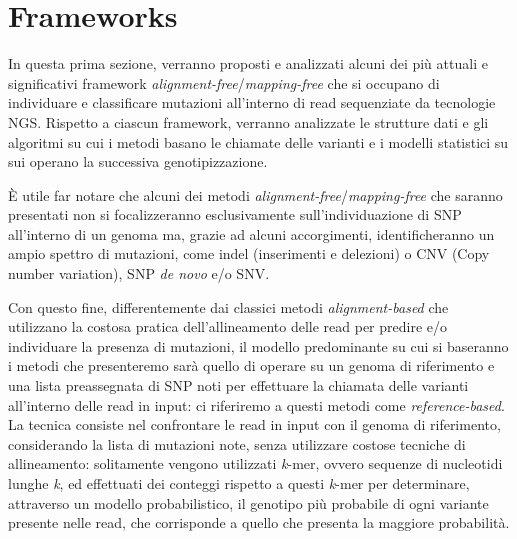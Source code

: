 \documentclass[../main.tex]{subfiles}
\begin{document}
\section{Frameworks}
\label{frameworks}

In questa prima sezione, verranno proposti e analizzati alcuni dei più attuali e significativi framework \textit{alignment-free}/\textit{mapping-free} che si occupano di individuare e classificare mutazioni all'interno di read sequenziate da tecnologie NGS. Rispetto a ciascun framework, verranno analizzate le strutture dati e gli algoritmi su cui i metodi basano le chiamate delle varianti e i modelli statistici su sui operano la successiva genotipizzazione.

È utile far notare che alcuni dei metodi \textit{alignment-free}/\textit{mapping-free} che saranno presentati non si focalizzeranno esclusivamente sull'individuazione di SNP all'interno di un genoma ma, grazie ad alcuni accorgimenti, identificheranno un ampio spettro di mutazioni, come indel (inserimenti e delezioni) o CNV (Copy number variation), SNP \textit{de novo} e/o SNV. 

Con questo fine, differentemente dai classici metodi \textit{alignment-based} che utilizzano la costosa pratica dell'allineamento delle read per predire e/o individuare la presenza di mutazioni, il modello predominante su cui si baseranno i metodi che presenteremo sarà quello di operare su un genoma di riferimento e una lista preassegnata di SNP noti per effettuare la chiamata delle varianti all'interno delle read in input: ci riferiremo a questi metodi come \textit{reference-based}. La tecnica consiste nel confrontare le read in input con il genoma di riferimento, considerando la lista di mutazioni note, senza utilizzare costose tecniche di allineamento: solitamente vengono utilizzati \textit{k}-mer, ovvero sequenze di nucleotidi lunghe \textit{k}, ed effettuati dei conteggi rispetto a questi \textit{k}-mer per determinare, attraverso un modello probabilistico, il genotipo più probabile di ogni variante presente nelle read, che corrisponde a quello che presenta la maggiore probabilità.
\end{document}
